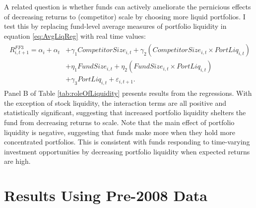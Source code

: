 \documentclass[openany]{book}
\theoremstyle{definition}
\theoremstyle{definition}
\theoremstyle{definition}
\theoremstyle{remark}
\begin{document}
A related question is whether funds can actively ameliorate the
pernicious effects of decreasing returns to (competitor) scale by
choosing more liquid portfolios. I test this by replacing fund-level
average measures of portfolio liquidity in equation \eqref{eq:AvgLiqReg}
with real time values: \begin{align}
\begin{split}
R^{FF3}_{i,t+1} = \alpha_i + \alpha_t &+ \gamma_1 CompetitorSize_{i,t} + \gamma_2 \left( CompetitorSize_{i,t} \times PortLiq_{i,t} \right) \\ 
&+ \eta_1 FundSize_{i,t} + \eta_2 \left( FundSize_{i,t} \times PortLiq_{i,t} \right)  \\
&+\gamma_3 PortLiq_{i,t} + \varepsilon_{i,t+1}.
\end{split}
\end{align} Panel B of Table \ref{tab:roleOfLiquidity} presents results
from the regressions. With the exception of stock liquidity, the
interaction terms are all positive and statistically significant,
suggesting that increased portfolio liquidity shelters the fund from
decreasing returns to scale. Note that the main effect of portfolio
liquidity is negative, suggesting that funds make more when they hold
more concentrated portfolios. This is consistent with funds responding
to time-varying investment opportunities by decreasing portfolio
liquidity when expected returns are high.

\hypertarget{results-using-pre-2008-data}{%
\section{Results Using Pre-2008
Data}\label{results-using-pre-2008-data}}
\end{document}
